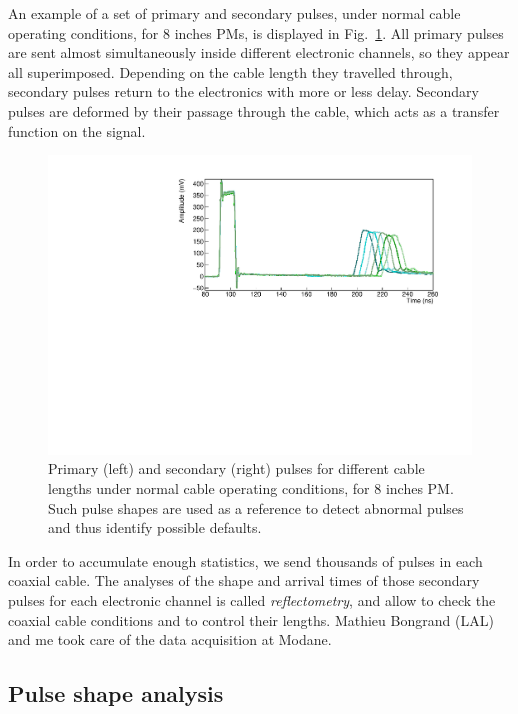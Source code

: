 An example of a set of primary and secondary pulses, under normal cable operating conditions, for $8$ inches PMs, is displayed in Fig.~\ref{fig:total_waveform}.
All primary pulses are sent almost simultaneously inside different electronic channels, so they appear all superimposed.
Depending on the cable length they travelled through, secondary pulses return to the electronics with more or less delay.
Secondary pulses are deformed by their passage through the cable, which acts as a transfer function on the signal.
\begin{figure}[h!]
  \centering
  \includegraphics[width=1\textwidth]{commissioning/fig_commissioning/pulses_example.pdf}
  \caption{Primary (left) and secondary (right) pulses for different cable lengths under normal cable operating conditions, for $8$ inches PM.
    Such pulse shapes are used as a reference to detect abnormal pulses and thus identify possible defaults.
    \label{fig:total_waveform}}
\end{figure}

In order to accumulate enough statistics, we send thousands of pulses in each coaxial cable.
The analyses of the shape and arrival times of those secondary pulses for each electronic channel is called \emph{reflectometry}, and allow to check the coaxial cable conditions and to control their lengths.
Mathieu Bongrand (LAL) and me took care of the data acquisition at Modane.



\subsection{Pulse shape analysis}
\label{subsec:pulse_shape}

